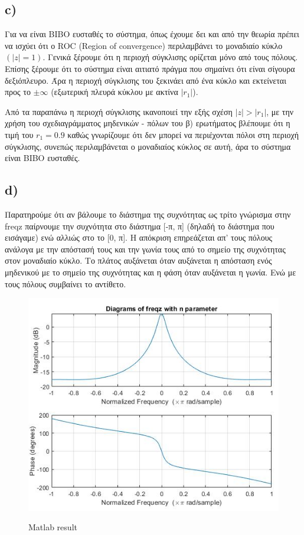\documentclass[11pt]{article}
\begin{document}
\subsection*{c)} 
Για να είναι BIBO ευσταθές το σύστημα, όπως έχουμε δει και από την θεωρία πρέπει να ισχύει ότι ο ROC (Region of convergence) περιλαμβάνει το μοναδιαίο κύκλο $(|z|=1)$. Γενικά ξέρουμε ότι η περιοχή σύγκλισης ορίζεται μόνο από τους πόλους. Επίσης ξέρουμε ότι το σύστημα είναι αιτιατό πράγμα που σημαίνει ότι είναι σίγουρα δεξιόπλευρο. Άρα η περιοχή σύγκλισης του ξεκινάει από ένα κύκλο και εκτείνεται προς το $\pm \infty$ (εξωτερική πλευρά κύκλου με ακτίνα $|r_1|$). 
\par \noindent
Από τα παραπάνω η περιοχή σύγκλισης ικανοποιεί την εξής σχέση $|z|>|r_1|$, με την χρήση του σχεδιαγράμματος μηδενικών - πόλων του β) ερωτήματος βλέπουμε ότι η τιμή του $r_1=0.9$ καθώς γνωρίζουμε ότι δεν μπορεί να περιέχονται πόλοι στη περιοχή σύγκλισης, συνεπώς περιλαμβάνεται ο μοναδιαίος κύκλος σε αυτή, άρα το σύστημα είναι BIBO ευσταθές.

\subsection*{d)}
Παρατηρούμε ότι αν βάλουμε το διάστημα της συχνότητας ως τρίτο γνώρισμα στην freqz παίρνουμε την συχνότητα στο διάστημα [-π, π] (δηλαδή το διάστημα που εισάγαμε) ενώ αλλιώς στο το [0, π]. Η απόκριση επηρεάζεται απ’ τους πόλους ανάλογα με την απόστασή τους και την γωνία τους από το σημείο της συχνότητας στον μοναδιαίο κύκλο. Το πλάτος αυξάνεται όταν αυξάνεται η απόσταση ενός μηδενικού με το σημείο της συχνότητας και η φάση όταν αυξάνεται η γωνία. Ενώ με τους πόλους συμβαίνει το αντίθετο.

\begin{figure}[H]
    \centering
   \includegraphics[scale=0.9]{photos/1d-magnitude-phase_diagram.png} \\
    \caption{Matlab result}
\end{figure}
\end{document}
